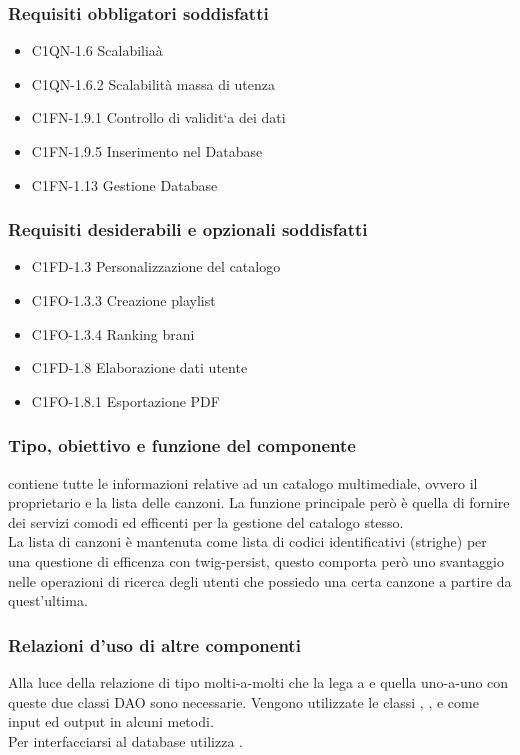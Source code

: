 \subsubsection*{Requisiti obbligatori soddisfatti}
\begin{itemize}
	\item C1QN-1.6 Scalabilia\`a
	\item C1QN-1.6.2 Scalabilit\`a massa di utenza
	\item C1FN-1.9.1 Controllo di validit`a dei dati
	\item C1FN-1.9.5 Inserimento nel Database
	\item C1FN-1.13 Gestione Database
\end{itemize}
\subsubsection*{Requisiti desiderabili e opzionali soddisfatti}
\begin{itemize}
    \item C1FD-1.3 Personalizzazione del catalogo
    \item C1FO-1.3.3 Creazione playlist 
    \item C1FO-1.3.4 Ranking brani
    \item C1FD-1.8 Elaborazione dati utente
    \item C1FO-1.8.1 Esportazione PDF
\end{itemize}
\subsubsection*{Tipo, obiettivo e funzione del componente} 
contiene tutte le informazioni relative ad un catalogo multimediale, ovvero
il proprietario e la lista delle canzoni. La funzione principale per\`o \`e
quella di fornire dei servizi comodi ed efficenti per la gestione del catalogo
stesso.\\
La lista di canzoni \`e mantenuta come lista di codici identificativi (strighe)
per una questione di efficenza con twig-persist, questo comporta per\`o uno
svantaggio nelle operazioni di ricerca degli utenti che possiedo una certa
canzone a partire da quest'ultima. 
\subsubsection*{Relazioni d'uso di altre componenti}
Alla luce della relazione di tipo molti-a-molti che la lega a  e quella
uno-a-uno con  queste due classi DAO sono necessarie. Vengono
utilizzate le classi , ,
 e  come input ed output in alcuni metodi.\\ Per interfacciarsi al database utilizza .
